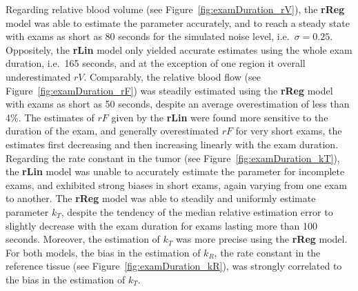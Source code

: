 Regarding relative blood volume (see Figure~\ref{fig:examDuration_rV}), the \textbf{rReg} model was able to estimate the parameter accurately, and to reach a steady state with exams as short as 80 seconds for the simulated noise level, i.e.~$\sigma = 0.25$.
Oppositely, the \textbf{rLin} model only yielded accurate estimates using the whole exam duration, i.e.~165 seconds, and at the exception of one region it overall underestimated $rV$.
Comparably, the relative blood flow (see Figure~\ref{fig:examDuration_rF}) was steadily estimated using the \textbf{rReg} model with exams as short as 50 seconds, despite an average overestimation of less than 4\%.
The estimates of $rF$ given by the \textbf{rLin} were found more sensitive to the duration of the exam, and generally overestimated $rF$ for very short exams, the estimates first decreasing and then increasing linearly with the exam duration.
Regarding the rate constant in the tumor (see Figure~\ref{fig:examDuration_kT}), the \textbf{rLin} model was unable to accurately estimate the parameter for incomplete exams, and exhibited strong biases in short exams, again varying from one exam to another. 
The \textbf{rReg} model was able to steadily and uniformly estimate parameter $k_T$, despite the tendency of the median relative estimation error to slightly decrease with the exam duration for exams lasting more than 100 seconds.
Moreover, the estimation of $k_T$ was more precise using the \textbf{rReg} model.
For both models, the bias in the estimation of $k_R$, the rate constant in the reference tissue (see Figure~\ref{fig:examDuration_kR}), was strongly correlated to the bias in the estimation of $k_T$.

